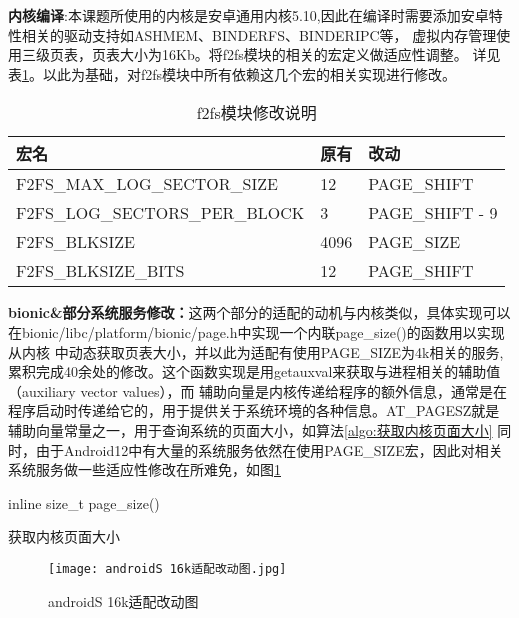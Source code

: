 \textbf{内核编译}:本课题所使用的内核是安卓通用内核5.10,因此在编译时需要添加安卓特性相关的驱动支持如ASHMEM、BINDERFS、BINDERIPC等，
虚拟内存管理使用三级页表，页表大小为16Kb。将f2fs模块的相关的宏定义做适应性调整。
详见表\ref{tab:f2fs模块修改说明}。以此为基础，对f2fs模块中所有依赖这几个宏的相关实现进行修改。
\begin{table}[h]
  \centering
  \caption{f2fs模块修改说明}
  \label{tab:f2fs模块修改说明}
  \begin{tabular}{lll}
    \toprule
    宏名   &   原有  &改动  \\
    \midrule
    F2FS\_MAX\_LOG\_SECTOR\_SIZE & 12 & PAGE\_SHIFT \\
    F2FS\_LOG\_SECTORS\_PER\_BLOCK & 3 & PAGE\_SHIFT - 9 \\
    F2FS\_BLKSIZE & 4096 & PAGE\_SIZE \\
    F2FS\_BLKSIZE\_BITS & 12 & PAGE\_SHIFT \\
    \bottomrule
  \end{tabular}
  \note{}
\end{table}

\textbf{bionic\&部分系统服务修改：}这两个部分的适配的动机与内核类似，具体实现可以在bionic/libc/platform/bionic/page.h中实现一个内联page\_size()的函数用以实现从内核
中动态获取页表大小，并以此为适配有使用PAGE\_SIZE为4k相关的服务,累积完成40余处的修改。这个函数实现是用getauxval来获取与进程相关的辅助值（auxiliary vector values），而
辅助向量是内核传递给程序的额外信息，通常是在程序启动时传递给它的，用于提供关于系统环境的各种信息。AT\_PAGESZ就是辅助向量常量之一，用于查询系统的页面大小，如算法\ref{algo:获取内核页面大小}
同时，由于Android12中有大量的系统服务依然在使用PAGE\_SIZE宏，因此对相关系统服务做一些适应性修改在所难免，如图\ref{fig:androidS 16k适配改动图}
\begin{algorithm}[H]
  \SetAlgoLined
  inline size\_t page\_size(){\\
  }
  \caption{获取内核页面大小}
  \label{algo:获取内核页面大小}
\end{algorithm}

\begin{figure}[h]
  \centering
  \texttt{[image: androidS 16k适配改动图.jpg]}
  \caption{androidS 16k适配改动图}
  \label{fig:androidS 16k适配改动图}
\end{figure}





